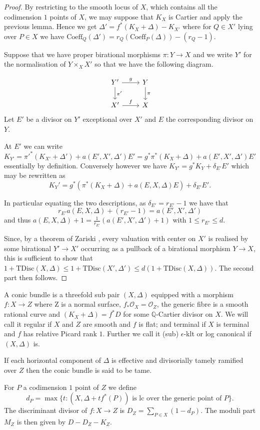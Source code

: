 \documentclass[a4paper,12pt]{book}
\newcommand{\ox}{\mathcal{O}_{X}}
\begin{document}
\begin{proof}
	
	By restricting to the smooth locus of $X$, which contains all the codimension $1$ points of $X$, we may suppose that $K_{X}$ is Cartier and apply the previous lemma. Hence we get $\Delta'=f^{*}(K_{X}+\Delta)-K_{X'}$ where for $Q\in X'$ lying over $P\in X$ we have $\text{Coeff}_{Q}(\Delta')=r_{Q}(\text{Coeff}_{P}(\Delta))-(r_{Q}-1)$.
	
	Suppose that we have proper birational morphisms $\pi\colon Y \to X$ and we write $Y'$ for the normalisation of $Y\times_{X} X'$ so that we have the following diagram.
	
	\[\begin{tikzcd}
	Y' \arrow[d, "\pi'"] \arrow[r, "g"] & Y \arrow[d, "\pi"] \\
	X' \arrow[r, "f"]                   & X                 
	\end{tikzcd}\]
	Let $E'$ be a divisor on $Y'$ exceptional over $X'$ and $E$ the corresponding divisor on $Y$.
	
	At $E'$ we can write $$K_{Y'}= \pi'^{*}(K_{X'}+\Delta')+a(E',X',\Delta')E'=g^{*}\pi^{*}(K_{X}+\Delta)+a(E',X',\Delta')E'$$
	essentially by definition. Conversely however we have $K_{Y'}=g^{*}K_{Y}+\delta_{E'}E'$ which may be rewritten as 
	$$K_{Y}'=g^{*}(\pi^{*}(K_{X}+\Delta)+a(E,X,\Delta)E)+\delta_{E'}E'.$$
	
	In particular equating the two descriptions, as $\delta_{E'}=r_{E'}-1$ we have that
	\[r_{E'}a(E,X,\Delta)+(r_{E'}-1)=a(E',X',\Delta')\]
	and thus $a(E,X,\Delta)+1=\frac{1}{r_{E'}}(a(E',X',\Delta')+1)$ with $1 \leq r_{E'} \leq d$.
	
	Since, by a theorem of Zariski \cite[Theorem VI.1.3]{k-rat-curves}, every valuation with center on $X'$ is realised by some birational $Y' \to X'$ occurring as a pullback of a birational morphism $Y \to X$, this is sufficient to show that $1+\text{TDisc}(X,\Delta) \leq 1+\text{TDisc}(X',\Delta') \leq d(1+\text{TDisc}(X,\Delta))$. The second part then follows.
\end{proof}


\begin{definition}
	A conic bundle is a threefold sub pair $(X,\Delta)$ equipped with a morphism $f\colon X \to Z$ where Z is a normal surface, $f_{*}\ox=\mathcal{O}_{Z}$, the generic fibre is a smooth rational curve and $(K_{X}+\Delta)=f^{*}D$ for some $\mathbb{Q}$-Cartier divisor on $X$. We will call it regular if $X$ and $Z$ are smooth and $f$ is flat; and terminal if $X$ is terminal and $f$ has relative Picard rank $1$. Further we call it (sub) $\epsilon$-klt or log canonical if $(X,\Delta)$ is.
	
	If each horizontal component of $\Delta$ is effective and divisorially tamely ramified over $Z$ then the conic bundle is said to be tame.
	
	For $P$ a codimension $1$ point of $Z$ we define $$d_{P}=\max\{t\colon  (X,\Delta+tf^{*}(P)) \text{ is lc over the generic point of } P\}.$$
	The discriminant divisor of $f\colon X \to Z$ is $D_{Z}=\sum_{P \in X}(1-d_{P})$.
	The moduli part $M_{Z}$ is then given by $D-D_{Z}-K_{Z}$.
\end{definition}
\end{document}
